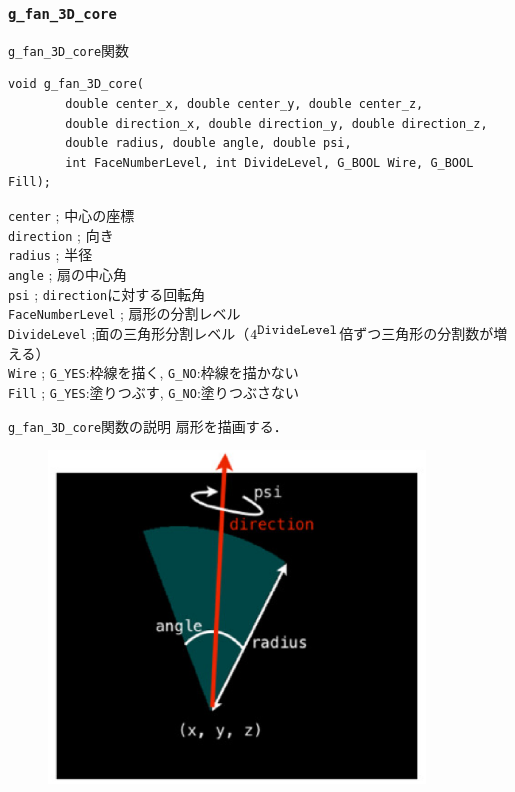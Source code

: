 \documentclass[platex,a4paper,12pt]{jsarticle}%
\begin{document}
\clearpage
\subsubsection{\texttt{g\_fan\_3D\_core}}

\begin{itembox}[l]{\texttt{g\_fan\_3D\_core}関数}
\begin{verbatim}
void g_fan_3D_core(
        double center_x, double center_y, double center_z,
        double direction_x, double direction_y, double direction_z,
        double radius, double angle, double psi,
        int FaceNumberLevel, int DivideLevel, G_BOOL Wire, G_BOOL Fill);
\end{verbatim}
\verb|center| ; 中心の座標\\
\verb|direction| ; 向き\\
\verb|radius| ; 半径\\
\verb|angle| ; 扇の中心角\\
\verb|psi| ; \verb|direction|に対する回転角\\
\verb|FaceNumberLevel| ; 扇形の分割レベル\\
\verb|DivideLevel| ;面の三角形分割レベル（$4^{\verb|DivideLevel|}$倍ずつ三角形の分割数が増える）\\
\verb|Wire| ; \verb|G_YES|:枠線を描く, \verb|G_NO|:枠線を描かない \\
\verb|Fill| ; \verb|G_YES|:塗りつぶす, \verb|G_NO|:塗りつぶさない 
\end{itembox}

\begin{itembox}[l]{\texttt{g\_fan\_3D\_core}関数の説明}
扇形を描画する．
\end{itembox}
\begin{figure}[htb]
	\includegraphics[width=100mm]{./Figures/eps/Canvas_g_fan.eps}
\end{figure}
\end{document}
